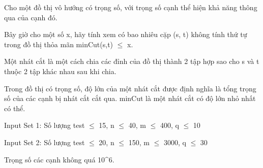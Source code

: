 Cho một đồ thị vô hướng có trọng số, với trọng số cạnh thể hiện khả năng thông qua của cạnh đó.  

   Bây giờ cho một số x, hãy tính xem có bao nhiêu cặp (s, t) không tính thứ tự trong đồ thị thỏa mãn minCut(s,t)  $\le$  x.  

   Một nhát cắt là một cách chia các đỉnh của đồ thị thành 2 tập hợp sao cho s và t thuộc 2 tập khác nhau sau khi chia.  

   Trong đồ thị có trọng số, độ lớn của một nhát cắt được định nghĩa là tổng trọng số của các cạnh bị nhát cắt cắt qua. minCut là một nhát cắt có độ lớn nhỏ nhất có thể.  

Input Set 1: Số lượng test  $\le$  15, n  $\le$  40, m  $\le$  400, q  $\le$  10  

   Input Set 2: Số lượng test  $\le$  20, n  $\le$  150, m  $\le$  3000, q  $\le$  30  

   Trọng số các cạnh không quá 10^6.